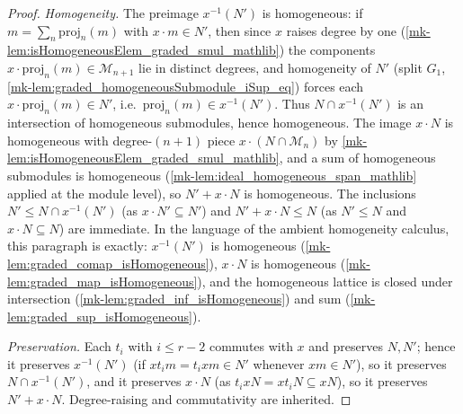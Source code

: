 \begin{proof}
  \leanok
    \emph{Homogeneity.} The preimage \(x^{-1}(N')\) is homogeneous: if
  \(m = \sum_n \mathrm{proj}_n(m)\) with \(x \cdot m \in N'\), then since \(x\) raises
  degree by one (\ref{mk-lem:isHomogeneousElem_graded_smul_mathlib}) the components
  \(x \cdot \mathrm{proj}_n(m) \in \mathcal{M}_{n+1}\) lie in distinct degrees, and
  homogeneity of \(N'\) (split \(G_1\),
  \ref{mk-lem:graded_homogeneousSubmodule_iSup_eq}) forces each
  \(x \cdot \mathrm{proj}_n(m) \in N'\), i.e.\ \(\mathrm{proj}_n(m) \in x^{-1}(N')\).
  Thus \(N \cap x^{-1}(N')\) is an intersection of homogeneous submodules, hence
  homogeneous. The image \(x \cdot N\) is homogeneous with degree-\((n+1)\) piece
  \(x \cdot (N \cap \mathcal{M}_n)\) by
  \ref{mk-lem:isHomogeneousElem_graded_smul_mathlib}, and a sum of homogeneous
  submodules is homogeneous (\ref{mk-lem:ideal_homogeneous_span_mathlib} applied at the
  module level), so \(N' + x \cdot N\) is homogeneous. The inclusions
  \(N' \le N \cap x^{-1}(N')\) (as \(x \cdot N' \subseteq N'\)) and
  \(N' + x \cdot N \le N\) (as \(N' \le N\) and \(x \cdot N \subseteq N\)) are
  immediate. In the language of the ambient homogeneity calculus, this paragraph is
  exactly: \(x^{-1}(N')\) is homogeneous (\ref{mk-lem:graded_comap_isHomogeneous}),
  \(x \cdot N\) is homogeneous (\ref{mk-lem:graded_map_isHomogeneous}), and the
  homogeneous lattice is closed under intersection
  (\ref{mk-lem:graded_inf_isHomogeneous}) and sum
  (\ref{mk-lem:graded_sup_isHomogeneous}).

  \emph{Preservation.} Each \(t_i\) with \(i \le r-2\) commutes with \(x\) and
  preserves \(N, N'\); hence it preserves \(x^{-1}(N')\) (if \(x t_i m = t_i x m \in
  N'\) whenever \(x m \in N'\)), so it preserves \(N \cap x^{-1}(N')\), and it
  preserves \(x \cdot N\) (as \(t_i x N = x t_i N \subseteq x N\)), so it preserves
  \(N' + x \cdot N\). Degree-raising and commutativity are inherited.


\end{proof}
